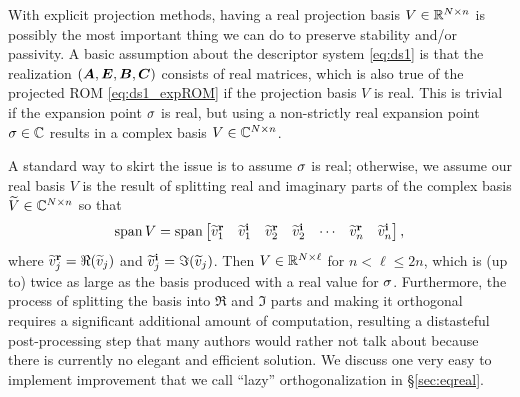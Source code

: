 With explicit projection methods, having a real projection basis $V\in\mathbb{R}^{N\times n}$ is possibly the most important thing we can do to preserve stability and/or passivity. A basic assumption about the descriptor system \eqref{eq:ds1} is that the realization $(\bm{A},\bm{E},\bm{B},\bm{C})$ consists of real matrices, which is also true of the projected ROM \eqref{eq:ds1_expROM} if the projection basis $V$ is real.  This is trivial if the expansion point $\sigma$ is real, but using a non-strictly real expansion point $\sigma\in\mathbb{C}$ results in a complex basis $V\in\mathbb{C}^{N\times n}$.    

A standard way to skirt the issue is to assume $\sigma$ is real; otherwise, we assume our real basis $V$ is the result of splitting real and imaginary parts of the complex basis $\widetilde{V}\in\mathbb{C}^{N\times n}$  so that 
\[
\operatorname*{span} V = \operatorname*{span} \begin{bmatrix} \widetilde{v}^\textbf{r}_1 & \widetilde{v}^\textbf{i}_1 & \widetilde{v}^\textbf{r}_2 & \widetilde{v}^\textbf{i}_2 & \cdots &  \widetilde{v}^\textbf{r}_n & \widetilde{v}^\textbf{i}_n\end{bmatrix},
\]
where $\widetilde{v}^\textbf{r}_j = \Re(\widetilde{v}_j)$ and $\widetilde{v}^\textbf{i}_j = \Im(\widetilde{v}_j)$. 
Then  $V\in\mathbb{R}^{N\times \ell}$ for $n<\ell\leq 2n$, which is (up to) twice as large as the basis produced with a real value for $\sigma$.  Furthermore, the process of splitting the basis into $\Re$ and $\Im$ parts and making it orthogonal requires a significant additional amount of computation, resulting a distasteful post-processing step that many authors would rather not talk about because there is currently  no elegant and efficient solution.  We discuss one very easy to implement improvement that we call ``lazy'' orthogonalization in  \S\ref{sec:eqreal}.



\clearpage
